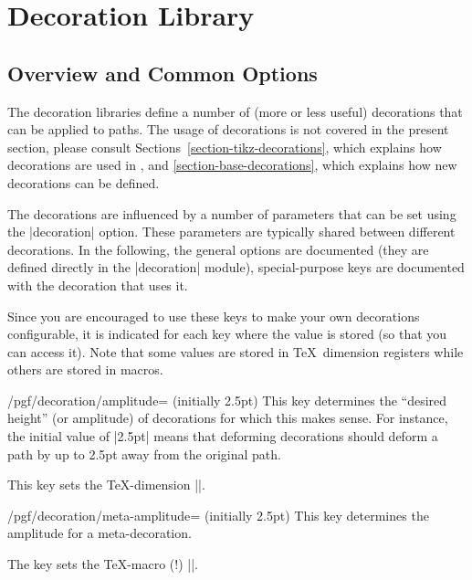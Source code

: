 %
%
%


\section[library-decorations]{Decoration Library}
\label{section-library-decorations}


\subsection{Overview and Common Options}

The decoration libraries define a number of (more or less useful) decorations
that can be applied to paths. The usage of decorations is not covered in the
present section, please consult Sections~\ref{section-tikz-decorations}, which
explains how decorations are used in \tikzname, and
\ref{section-base-decorations}, which explains how new decorations can be
defined.

The decorations are influenced by a number of parameters that can be set using
the |decoration| option. These parameters are typically shared between
different decorations. In the following, the general options are documented
(they are defined directly in the |decoration| module), special-purpose keys
are documented with the decoration that uses it.

Since you are encouraged to use these keys to make your own decorations
configurable, it is indicated for each key where the value is stored (so that
you can access it). Note that some values are stored in \TeX\ dimension
registers while others are stored in macros.

\begin{key}{/pgf/decoration/amplitude= (initially 2.5pt)}
    This key determines the ``desired height'' (or amplitude) of decorations
    for which this makes sense. For instance, the initial value of |2.5pt|
    means that deforming decorations should deform a path by up to 2.5pt away
    from the original path.

    This key sets the \TeX-dimension |\pgfdecorationsegmentamplitude|.
\end{key}

\begin{key}{/pgf/decoration/meta-amplitude= (initially 2.5pt)}
    This key determines the amplitude for a meta-decoration.

    The key sets the \TeX-macro (!) |\pgfmetadecorationsegmentamplitude|.
\end{key}

